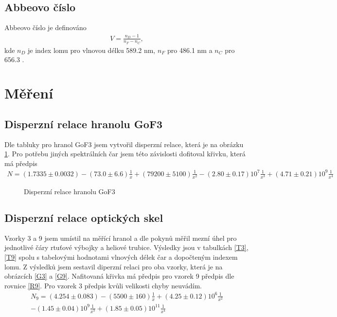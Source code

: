 \documentclass[a4paper,12pt]{article}
\begin{document}
\subsection{Abbeovo číslo}
Abbeovo číslo je definováno
\begin{eqnarray}
V=\frac{n_D-1}{n_F-n_C},
\end{eqnarray}
kde $n_D$ je index lomu pro vlnovou délku 589.2 nm, $n_F$ pro 486.1 nm a $n_C$ pro 656.3 .

\section{Měření}
\subsection{Disperzní relace hranolu GoF3}
Dle tabluky pro hranol GoF3 jsem vytvořil disperzní relace, která je na obrázku \ref{GGoF3}. Pro potřebu jiných spektrálních čar jsem této závislosti dofitoval 
křivku, která má předpis
\begin{eqnarray}
N=(1.7335\pm 0.0032)-(73.0\pm 6.6)\frac{1}{x}+(79200\pm 5100)\frac{1}{x^2}-(2.80\pm0.17)10^7\frac{1}{x^3}+(4.71\pm0.21)10^9\frac{1}{x^4}
\end{eqnarray}

\begin{figure}

\caption{Disperzní relace hranolu GoF3}
\label{GGoF3}
\end{figure}



\subsection{Disperzní relace optických skel}
Vzorky 3 a 9 jsem umístil na měřící hranol a dle pokynů měřil mezní úhel pro jednotlivé čáry rtuťové výbojky a heliové trubice. Výsledky jsou v tabulkách 
\ref{T3}, \ref{T9} spolu s tabelovými hodnotami vlnových délek čar a dopočteným indexem lomu. Z výsledků jsem sestavil diperzní relaci pro oba vzorky, která je na obrázcích \ref{G3} a \ref{G9}. Nafitovaná křivka má předpis pro vzorek 9 předpis dle rovnice \ref{R9}. Pro vzorek 3 předpis kvůli velikosti chyby neuvádím.
\begin{eqnarray}
N_9=(4.254\pm 0.083)-(5500\pm 160)\frac{1}{x}+(4.25\pm 0.12)10^6\frac{1}{x^2}\\
-(1.45\pm0.04)10^9\frac{1}{x^3}+(1.85\pm0.05)10^11\frac{1}{x^4}
\label{R9}
\end{eqnarray}
\end{document}
